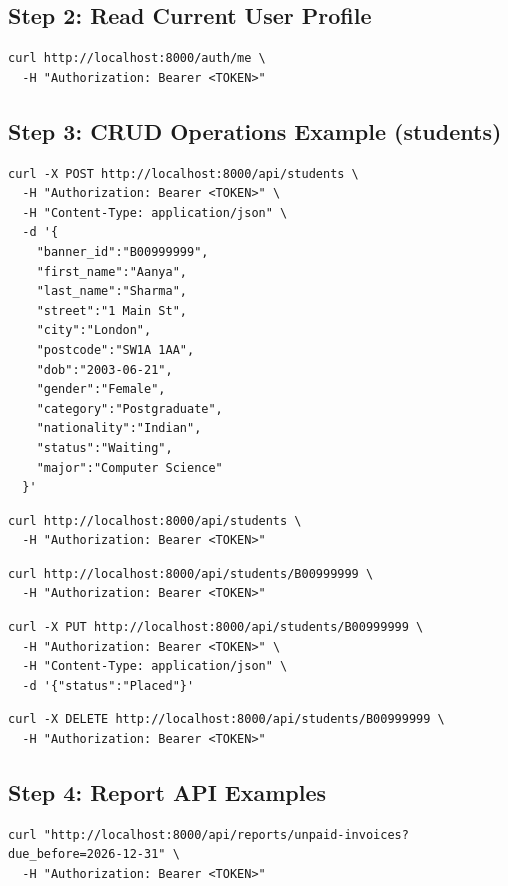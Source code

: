 \documentclass[11pt,a4paper]{article}
\begin{document}
\subsection{Step 2: Read Current User Profile}
\begin{lstlisting}[language={}]
curl http://localhost:8000/auth/me \
  -H "Authorization: Bearer <TOKEN>"
\end{lstlisting}

\subsection{Step 3: CRUD Operations Example (students)}
\begin{lstlisting}[language={},caption={Create student}]
curl -X POST http://localhost:8000/api/students \
  -H "Authorization: Bearer <TOKEN>" \
  -H "Content-Type: application/json" \
  -d '{
    "banner_id":"B00999999",
    "first_name":"Aanya",
    "last_name":"Sharma",
    "street":"1 Main St",
    "city":"London",
    "postcode":"SW1A 1AA",
    "dob":"2003-06-21",
    "gender":"Female",
    "category":"Postgraduate",
    "nationality":"Indian",
    "status":"Waiting",
    "major":"Computer Science"
  }'
\end{lstlisting}

\begin{lstlisting}[language={},caption={List students}]
curl http://localhost:8000/api/students \
  -H "Authorization: Bearer <TOKEN>"
\end{lstlisting}

\begin{lstlisting}[language={},caption={Get one student}]
curl http://localhost:8000/api/students/B00999999 \
  -H "Authorization: Bearer <TOKEN>"
\end{lstlisting}

\begin{lstlisting}[language={},caption={Update student}]
curl -X PUT http://localhost:8000/api/students/B00999999 \
  -H "Authorization: Bearer <TOKEN>" \
  -H "Content-Type: application/json" \
  -d '{"status":"Placed"}'
\end{lstlisting}

\begin{lstlisting}[language={},caption={Delete student (admin only)}]
curl -X DELETE http://localhost:8000/api/students/B00999999 \
  -H "Authorization: Bearer <TOKEN>"
\end{lstlisting}

\subsection{Step 4: Report API Examples}
\begin{lstlisting}[language={},caption={Report e: unpaid invoices up to date}]
curl "http://localhost:8000/api/reports/unpaid-invoices?due_before=2026-12-31" \
  -H "Authorization: Bearer <TOKEN>"
\end{lstlisting}
\end{document}
